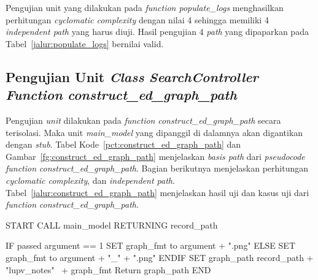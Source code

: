 Pengujian unit yang dilakukan pada \emph{function populate\_logs}
menghasilkan perhitungan \emph{cyclomatic complexity} dengan nilai 4 sehingga
memiliki 4 \emph{independent path} yang harus diuji. Hasil pengujian 4
\emph{path} yang dipaparkan pada Tabel~\ref{jalur:populate_logs} bernilai valid.

\subsection{Pengujian Unit \emph{Class} \emph{SearchController} \emph{Function} \newline
  \emph{construct\_ed\_graph\_path}}

Pengujian \emph{unit} dilakukan pada \emph{function}
\emph{construct\_ed\_graph\_path} secara terisolasi. Maka unit
\emph{main\_model} yang dipanggil di dalamnya akan digantikan
dengan \emph{stub}. Tabel Kode~\ref{pct:construct_ed_graph_path} dan
Gambar~\ref{fg:construct_ed_graph_path} menjelaskan \emph{basis path}
dari \emph{pseudocode} \emph{function} \emph{construct\_ed\_graph\_path}. Bagian
berikutnya menjelaskan perhitungan \emph{cyclomatic complexity},
dan \emph{independent path}.  Tabel~\ref{jalur:construct_ed_graph_path} menjelaskan
hasil uji dan kasus uji dari \emph{function} \emph{construct\_ed\_graph\_path}.

\par\null\par
\begin{code}
\begin{ignasicblock}[title=construct\_ed\_graph\_path,minted language=text,
underlay={
  \drawline{10cm}{11.5cm}{2.3}{1}
  \drawline{10cm}{12.5cm}{4.5}{2}
  \drawline{10cm}{11.5cm}{6}{3}
  \drawline{11cm}{12.5cm}{8.5}{4}
  \drawline{7cm}{11.5cm}{9.8}{5}
  \drawbrace{11.5cm}{10.5}{13.5}{6}
 }]

START
  CALL main_model RETURNING record_path

  IF passed argument == 1
    SET graph_fmt to argument + ".png"
  ELSE
    SET graph_fmt to argument + "_" + ".png"
  ENDIF
  SET graph_path record_path + "lupv_notes" \
                                  + graph_fmt
  Return graph_path
END
\end{ignasicblock}
  \label{pct:construct_ed_graph_path}
\end{code}

